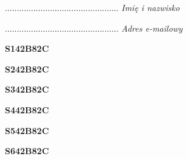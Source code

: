 \begin{turn}{90}\begin{minipage}{\linewidth} \vspace{20mm} ................................................  \textit{Imię i nazwisko}\end{minipage}\end{turn}

\begin{turn}{90}\begin{minipage}{\linewidth} \vspace{20mm} ................................................  \textit{Adres e-mailowy}\end{minipage}\end{turn}

\begin{turn}{90}\huge \begin{minipage}{\linewidth} \vspace{10mm}\textbf{S142B82C}\end{minipage}\end{turn}

\begin{turn}{90}\huge \begin{minipage}{\linewidth} \vspace{10mm}\textbf{S242B82C}\end{minipage}\end{turn}

\begin{turn}{90}\huge \begin{minipage}{\linewidth} \vspace{10mm}\textbf{S342B82C}\end{minipage}\end{turn}

\begin{turn}{90}\huge \begin{minipage}{\linewidth} \vspace{10mm}\textbf{S442B82C}\end{minipage}\end{turn}

\begin{turn}{90}\huge \begin{minipage}{\linewidth} \vspace{10mm}\textbf{S542B82C}\end{minipage}\end{turn}

\begin{turn}{90}\huge \begin{minipage}{\linewidth} \vspace{10mm}\textbf{S642B82C}\end{minipage}\end{turn}

